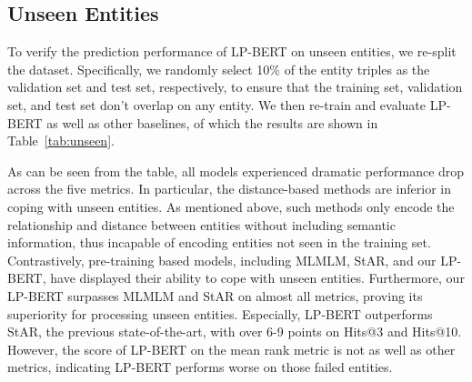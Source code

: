 \documentclass[journal]{IEEEtran}
\begin{document}
\subsection{Unseen Entities}

To verify the prediction performance of LP-BERT on unseen entities, we re-split the dataset. Specifically, we randomly select 10\% of the entity triples as the validation set and test set, respectively, to ensure that the training set, validation set, and test set don't overlap on any entity. We then re-train and evaluate LP-BERT as well as other baselines, of which the results are shown in Table~\ref{tab:unseen}. 

As can be seen from the table, all models experienced dramatic performance drop across the five metrics. In particular, the distance-based methods are inferior in coping with unseen entities. As mentioned above, such methods only encode the relationship and distance between entities without including semantic information, thus incapable of encoding entities not seen in the training set. Contrastively, pre-training based models, including MLMLM, StAR, and our LP-BERT, have displayed their ability to cope with unseen entities. Furthermore, our LP-BERT surpasses MLMLM and StAR on almost all metrics, proving its superiority for processing unseen entities. Especially, LP-BERT outperforms StAR, the previous state-of-the-art, with over 6-9 points on Hits@3 and Hits@10. However, the score of LP-BERT on the mean rank metric is not as well as other metrics, indicating LP-BERT performs worse on those failed entities. 

\begin{table}[htbp]
	\small
\centering
\caption{\label{tab:unseen} Performance of LP-BERT on unseen entities.}
\end{table}
\end{document}
